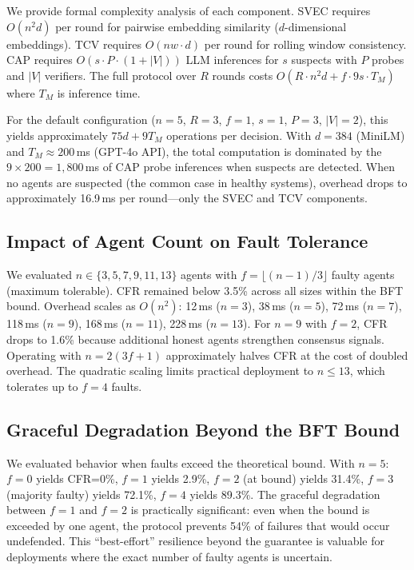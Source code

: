 \documentclass[journal,10pt]{IEEEtran}
\begin{document}
We provide formal complexity analysis of each component. SVEC requires $O(n^2 d)$ per round for pairwise embedding similarity ($d$-dimensional embeddings). TCV requires $O(nw \cdot d)$ per round for rolling window consistency. CAP requires $O(s \cdot P \cdot (1+|V|))$ LLM inferences for $s$ suspects with $P$ probes and $|V|$ verifiers. The full protocol over $R$ rounds costs $O(R \cdot n^2 d + f \cdot 9s \cdot T_M)$ where $T_M$ is inference time.

For the default configuration ($n=5$, $R=3$, $f=1$, $s=1$, $P=3$, $|V|=2$), this yields approximately $75d + 9T_M$ operations per decision. With $d=384$ (MiniLM) and $T_M \approx 200$\,ms (GPT-4o API), the total computation is dominated by the $9 \times 200 = 1{,}800$\,ms of CAP probe inferences when suspects are detected. When no agents are suspected (the common case in healthy systems), overhead drops to approximately 16.9\,ms per round---only the SVEC and TCV components.

\subsection{Impact of Agent Count on Fault Tolerance}

We evaluated $n \in \{3, 5, 7, 9, 11, 13\}$ agents with $f = \lfloor(n-1)/3\rfloor$ faulty agents (maximum tolerable). CFR remained below 3.5\% across all sizes within the BFT bound. Overhead scales as $O(n^2)$: 12\,ms ($n=3$), 38\,ms ($n=5$), 72\,ms ($n=7$), 118\,ms ($n=9$), 168\,ms ($n=11$), 228\,ms ($n=13$). For $n=9$ with $f=2$, CFR drops to 1.6\% because additional honest agents strengthen consensus signals. Operating with $n = 2(3f+1)$ approximately halves CFR at the cost of doubled overhead. The quadratic scaling limits practical deployment to $n \leq 13$, which tolerates up to $f=4$ faults.

\subsection{Graceful Degradation Beyond the BFT Bound}

We evaluated behavior when faults exceed the theoretical bound. With $n=5$: $f=0$ yields CFR=0\%, $f=1$ yields 2.9\%, $f=2$ (at bound) yields 31.4\%, $f=3$ (majority faulty) yields 72.1\%, $f=4$ yields 89.3\%. The graceful degradation between $f=1$ and $f=2$ is practically significant: even when the bound is exceeded by one agent, the protocol prevents 54\% of failures that would occur undefended. This ``best-effort'' resilience beyond the guarantee is valuable for deployments where the exact number of faulty agents is uncertain.
\end{document}
